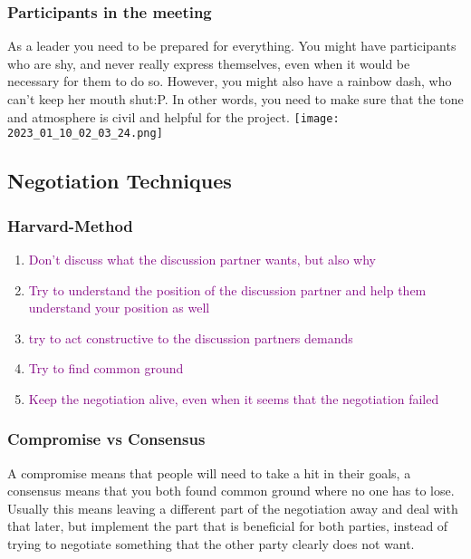 \documentclass[main.tex,fontsize=12pt,paper=a4,paper=landscape,DIV=calc,]{scrartcl}
\begin{document}
\begin{multicols*}{2}
\subsubsection{Participants in the meeting}
As a leader you need to be prepared for everything.\newline
You might have participants who are shy, and never really express themselves, even when it would be necessary for them to do so.\newline
However, you might also have a rainbow dash, who can't keep her mouth shut:P. \newline
In other words, you need to make sure that the tone and atmosphere is civil and helpful for the project.\newline
\texttt{[image: 2023\_01\_10\_02\_03\_24.png]}

\subsection{Negotiation Techniques}
\subsubsection{Harvard-Method}
\begin{enumerate}
\item \textcolor{purple}{Don't discuss what the discussion partner wants, but also why}
\item \textcolor{purple}{Try to understand the position of the discussion partner and help them understand your position as well}
\item \textcolor{purple}{try to act constructive to the discussion partners demands}
\item \textcolor{purple}{Try to find common ground}
\item \textcolor{purple}{Keep the negotiation alive, even when it seems that the negotiation failed}
\end{enumerate} 

\subsubsection{Compromise vs Consensus}
A compromise means that people will need to take a hit in their goals, a consensus means that you both found common ground where no one has to lose.\newline
Usually this means leaving a different part of the negotiation away and deal with that later, but implement the part that is beneficial for both parties, instead of trying to negotiate something that the other party clearly does not want.


\end{multicols*}
\end{document}
